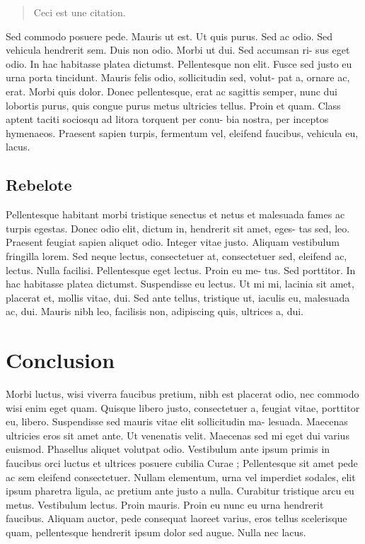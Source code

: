 \documentclass[12pt,twocolumn,twoside]{article}
\begin{document}
\begin{quote}
    Ceci est une citation.
\end{quote}

Sed commodo posuere pede. Mauris ut est. Ut quis purus. Sed ac odio.
Sed vehicula hendrerit sem. Duis non odio. Morbi ut dui. Sed accumsan ri-
sus eget odio. In hac habitasse platea dictumst. Pellentesque non elit. Fusce
sed justo eu urna porta tincidunt. Mauris felis odio, sollicitudin sed, volut-
pat a, ornare ac, erat. Morbi quis dolor. Donec pellentesque, erat ac sagittis
semper, nunc dui lobortis purus, quis congue purus metus ultricies tellus.
Proin et quam. Class aptent taciti sociosqu ad litora torquent per conu-
bia nostra, per inceptos hymenaeos. Praesent sapien turpis, fermentum vel,
eleifend faucibus, vehicula eu, lacus.

\subsection{Rebelote}
Pellentesque habitant morbi tristique senectus et netus et malesuada
fames ac turpis egestas. Donec odio elit, dictum in, hendrerit sit amet, eges-
tas sed, leo. Praesent feugiat sapien aliquet odio. Integer vitae justo. Aliquam
vestibulum fringilla lorem. Sed neque lectus, consectetuer at, consectetuer
sed, eleifend ac, lectus. Nulla facilisi. Pellentesque eget lectus. Proin eu me-
tus. Sed porttitor. In hac habitasse platea dictumst. Suspendisse eu lectus.
Ut mi mi, lacinia sit amet, placerat et, mollis vitae, dui. Sed ante tellus,
tristique ut, iaculis eu, malesuada ac, dui. Mauris nibh leo, facilisis non,
adipiscing quis, ultrices a, dui.

\section*{Conclusion}
Morbi luctus, wisi viverra faucibus pretium, nibh est placerat odio, nec
commodo wisi enim eget quam. Quisque libero justo, consectetuer a, feugiat
vitae, porttitor eu, libero. Suspendisse sed mauris vitae elit sollicitudin ma-
lesuada. Maecenas ultricies eros sit amet ante. Ut venenatis velit. Maecenas
sed mi eget dui varius euismod. Phasellus aliquet volutpat odio. Vestibulum
ante ipsum primis in faucibus orci luctus et ultrices posuere cubilia Curae ;
Pellentesque sit amet pede ac sem eleifend consectetuer. Nullam elementum,
urna vel imperdiet sodales, elit ipsum pharetra ligula, ac pretium ante justo
a nulla. Curabitur tristique arcu eu metus. Vestibulum lectus. Proin mauris.
Proin eu nunc eu urna hendrerit faucibus. Aliquam auctor, pede consequat
laoreet varius, eros tellus scelerisque quam, pellentesque hendrerit ipsum
dolor sed augue. Nulla nec lacus.
\end{document}
